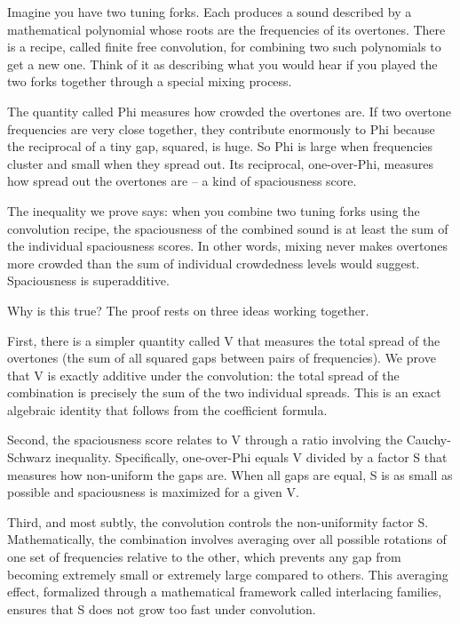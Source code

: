 
Imagine you have two tuning forks. Each produces a sound described by
a mathematical polynomial whose roots are the frequencies of its
overtones. There is a recipe, called finite free convolution, for
combining two such polynomials to get a new one. Think of it as
describing what you would hear if you played the two forks together
through a special mixing process.

The quantity called Phi measures how crowded the overtones are. If two
overtone frequencies are very close together, they contribute
enormously to Phi because the reciprocal of a tiny gap, squared, is
huge. So Phi is large when frequencies cluster and small when they
spread out. Its reciprocal, one-over-Phi, measures how spread out the
overtones are -- a kind of spaciousness score.

The inequality we prove says: when you combine two tuning forks using
the convolution recipe, the spaciousness of the combined sound is at
least the sum of the individual spaciousness scores. In other words,
mixing never makes overtones more crowded than the sum of individual
crowdedness levels would suggest. Spaciousness is superadditive.

Why is this true? The proof rests on three ideas working together.

First, there is a simpler quantity called V that measures the total
spread of the overtones (the sum of all squared gaps between pairs of
frequencies). We prove that V is exactly additive under the
convolution: the total spread of the combination is precisely the sum
of the two individual spreads. This is an exact algebraic identity
that follows from the coefficient formula.

Second, the spaciousness score relates to V through a ratio involving
the Cauchy-Schwarz inequality. Specifically, one-over-Phi equals V
divided by a factor S that measures how non-uniform the gaps are. When
all gaps are equal, S is as small as possible and spaciousness is
maximized for a given V.

Third, and most subtly, the convolution controls the non-uniformity
factor S. Mathematically, the combination involves averaging over all
possible rotations of one set of frequencies relative to the other,
which prevents any gap from becoming extremely small or extremely
large compared to others. This averaging effect, formalized through
a mathematical framework called interlacing families, ensures that S
does not grow too fast under convolution.

